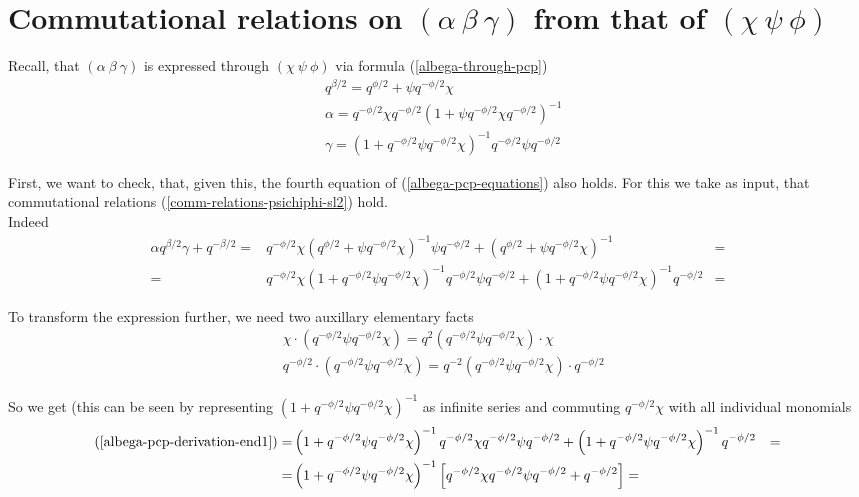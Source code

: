 \documentclass{article}
\newcommand{\lb}{\left (}
\newcommand{\rb}{\right )}
\newcommand{\lsb}{\left [}
\newcommand{\rsb}{\right ]}
\newcommand{\be}{\begin{eqnarray}}
\newcommand{\ee}{\end{eqnarray}}
\newcommand {\?}{\textit{???}}
\newcommand{\delabel}[1]{(\ref{#1})}
\begin{document}
\section{Commutational relations on $(\alpha\ \beta\ \gamma)$ from that of $(\chi\ \psi\ \phi)$}
\label{alpha-beta-gamma-from-chi-psi-phi}

Recall, that $(\alpha\ \beta\ \gamma)$ is expressed through $(\chi\ \psi\ \phi)$ via formula \delabel{albega-through-pcp}
\be
& q^{\beta/2} = q^{\phi/2} + \psi q^{-\phi/2} \chi \nonumber \\
& \alpha = q^{-\phi/2} \chi q^{-\phi/2} \lb 1 + \psi q^{-\phi/2} \chi q^{-\phi/2} \rb^{-1} \nonumber \\
& \gamma = \lb 1 + q^{-\phi/2} \psi q^{-\phi/2} \chi \rb^{-1} q^{-\phi/2} \psi q^{-\phi/2} \nonumber 
\ee

First, we want to check, that, given this, the fourth equation of \delabel{albega-pcp-equations} also holds.
For this we take as input, that commutational relations \delabel{comm-relations-psichiphi-sl2} hold.
\\
Indeed
\def\qbHalf{\lb q^{\phi/2} + \psi q^{-\phi/2} \chi \rb}
\def\qbMinusHalf{\qbHalf^{-1}}
\def\qbHalfNorm{\lb 1 + q^{-\phi/2} \psi q^{-\phi/2} \chi \rb}
\def\qbMinusHalfNorm{\qbHalfNorm^{-1}}
\be
\alpha q^{\beta/2} \gamma + q^{-\beta/2}
= & q^{-\phi/2}\chi \qbMinusHalf \psi q^{-\phi/2}
+ \qbMinusHalf & = \nonumber \\
\label{albega-pcp-derivation-end1}
= & q^{-\phi/2} \chi \qbMinusHalfNorm q^{-\phi/2} \psi q^{-\phi/2} + \qbMinusHalfNorm q^{-\phi/2} & =
\ee

To transform the expression further, we need two auxillary elementary facts
\be
& \chi \cdot \lb q^{-\phi/2} \psi q^{-\phi/2} \chi \rb
= q^{2} \lb q^{-\phi/2}\psi q^{-\phi/2} \chi \rb \cdot \chi \nonumber \\
& q^{-\phi/2} \cdot \lb q^{-\phi/2} \psi q^{-\phi/2} \chi \rb
= q^{-2} \lb q^{-\phi/2}\psi q^{-\phi/2} \chi \rb \cdot q^{-\phi/2} \nonumber
\ee

So we get (this can be seen by representing $\qbMinusHalfNorm$ as infinite series and commuting $q^{-\phi/2}\chi$
with all individual monomials
\be
\delabel{albega-pcp-derivation-end1} = & \qbMinusHalfNorm q^{-\phi/2} \chi q^{-\phi/2} \psi q^{-\phi/2}
+ \qbMinusHalfNorm q^{-\phi/2} & = \nonumber \\
= & \qbMinusHalfNorm \lsb q^{-\phi/2} \chi q^{-\phi/2} \psi q^{-\phi/2} + q^{-\phi/2}\rsb = \label{albega-pcp-derivation-end2}
\ee
\end{document}
